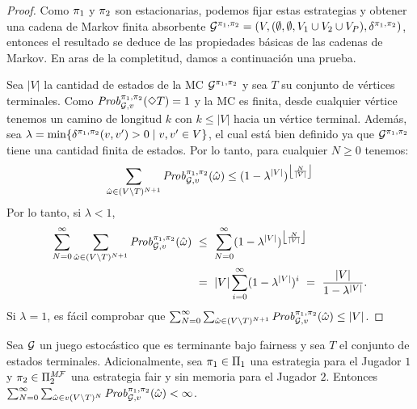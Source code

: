 \begin{proof}
  Como $\pi_{1}$ y $\pi_{2}$ son estacionarias, podemos fijar estas estrategias
  y obtener una cadena de Markov finita absorbente
  $\mathcal{G}^{\pi_{1},\pi_{2}} = (V, (\emptyset,\emptyset, V_1 \cup V_2 \cup V_P), \delta^{\pi_{1}, \pi_{2}})$,
  entonces el resultado se deduce de las propiedades básicas de las cadenas de Markov. En aras de la completitud, damos a continuación una prueba.
  
  Sea $|V|$ la cantidad de estados de la MC
  $\mathcal{G}^{\pi_{1},\pi_{2}}$ y sea $T$ su conjunto de vértices terminales.
  Como $\mathit{Prob}^{\pi_{1}, \pi_{2}}_{\mathcal{G},v}(\Diamond T) = 1$
  y la MC es finita, desde cualquier vértice tenemos un camino de longitud $k$
  con $k \leq|V|$ hacia un vértice terminal.
  Además, sea
  $\lambda = \min \{ \delta^{\pi_{1},\pi_{2}}(v,v') > 0 \mid v,v' \in V \}$,
  el cual está bien definido ya que $\mathcal{G}^{\pi_{1},\pi_{2}}$ tiene una cantidad finita de estados.
  Por lo tanto, para cualquier $N\geq 0$ tenemos:
  \[
  \sum_{\hat{\omega} \in (V \setminus T)^{N+1}} \mathit{Prob}^{\pi_{1}, \pi_{2}}_{\mathcal{G},v}(\hat{\omega}) \leq (1 - \lambda^{|V|})^{\left\lfloor{\frac{N}{|V|}}\right\rfloor}
  \]
  Por lo tanto, si $\lambda<1$,
  \begin{align*}
    \sum^\infty_{N=0}\sum_{\hat{\omega} \in (V \setminus T)^{N+1}} \Prob{\strat{1}}{\strat{2}}_{\StochG,v}(\hat{\omega}) & \ \leq \ \sum^{\infty}_{N=0}(1 - \lambda^{|V|})^{\left\lfloor{\frac{N}{|V|}}\right\rfloor} \\
    & \ = \ {|V|}\sum^{\infty}_{i=0}(1 - \lambda^{|V|})^i \ = \ \frac{|V|}{1 - \lambda^{|V|}}.
  \end{align*}
  Si $\lambda = 1$, es fácil comprobar que
  $\sum^\infty_{N=0}\sum_{\hat{\omega} \in (V \setminus T)^{N+1}} \mathit{Prob}^{\pi_{1}, \pi_{2}}_{\mathcal{G},v}(\hat{\omega}) \leq {|V|}$.
  \qedhere
\end{proof}

\begin{lemma}\label{lm:games-are-bounded}
  Sea $\mathcal{G}$ un juego estocástico que es terminante bajo fairness
  y sea $T$ el conjunto de estados terminales. Adicionalmente, sea
  $\pi_{1} \in \Pi_{1}$ una estrategia para el Jugador $1$ y
  $\pi_{2} \in \Pi^{\textit{M}\mathcal{F}}_{2}$ una estrategia fair y sin memoria para el Jugador $2$.  Entonces
  $\sum^\infty_{N=0} \sum_{\hat{\omega} \in v(V \setminus T)^N} \mathit{Prob}^{\pi_{1}, \pi_{2}}_{\mathcal{G},v}(\hat{\omega}) < \infty$.
\end{lemma}

